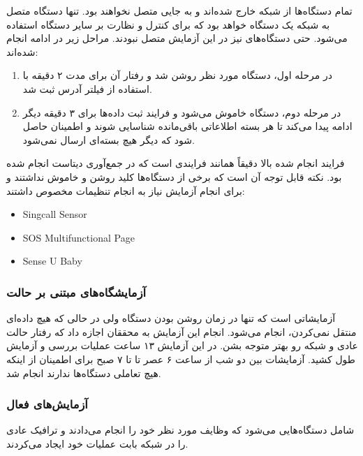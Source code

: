 تمام دستگاه‌ها از شبکه خارج شده‌اند و به جایی متصل نخواهند بود. تنها دستگاه متصل
به شبکه یک دستگاه  خواهد بود که برای کنترل و نظارت بر سایر دستگاه
استفاده می‌شود. حتی دستگاه‌های  نیز در این آزمایش متصل نبودند. مراحل زیر
در ادامه انجام شده‌اند:

\begin{enumerate}
    \item در مرحله اول، دستگاه مورد نظر روشن شد و رفتار آن برای مدت ۲ دقیقه با
    استفاده از فیلتر آدرس  ثبت شد.
    \item در مرحله دوم، دستگاه خاموش می‌شود و فرایند ثبت داده‌ها برای ۳ دقیقه
    دیگر ادامه پیدا می‌کند تا هر بسته اطلاعاتی باقی‌مانده شناسایی شوند و اطمینان
    حاصل شود که دیگر هیچ بسته‌ای ارسال نمی‌شود.
\end{enumerate}

فرایند انجام شده بالا دقیقاً همانند فرایندی است که در جمع‌آوری دیتاست
 انجام شده بود. نکته قابل توجه آن است که برخی از دستگاه‌ها کلید
روشن و خاموش نداشتند و برای انجام آزمایش نیاز به انجام تنظیمات مخصوص داشتند:

\begin{LTR}
    \begin{itemize}
        \item Singcall Sensor
        \item SOS Multifunctional Page
        \item Sense U Baby
    \end{itemize}
\end{LTR}

\subsubsection{آزمایشگاه‌های مبتنی بر حالت }

آزمایشاتی است که تنها در زمان روشن بودن دستگاه ولی در حالی که هیچ داده‌ای منتقل
نمی‌کردن، انجام می‌شود. انجام این آزمایش به محققان اجازه داد که رفتار حالت عادی
و  شبکه رو بهتر متوجه بشن. در این آزمایش ۱۳ ساعت عملیات بررسی و
آزمایش طول کشید. آزمایشات بین دو شب از ساعت ۶ عصر تا تا ۷ صبح برای اطمینان از
اینکه هیچ تعاملی دستگاه‌ها ندارند انجام شد.

\subsubsection{آزمایش‌های فعال}

شامل دستگاه‌هایی می‌شود که وظایف مورد نظر خود را انجام می‌دادند و ترافیک عادی را
در شبکه بابت عملیات خود ایجاد می‌کردند.

